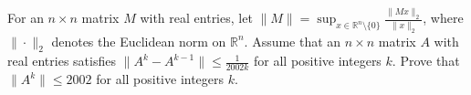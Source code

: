 For an \(n\times n\) matrix \(M\) with real entries, let \(\|M\|=\sup_{x\in \mathbb{R}^{n}\setminus\{0\}}\frac{\|Mx\|_{2}}{\|x\|_{2}}\), where \(\|\cdot\|_{2}\) denotes the Euclidean norm on \(\mathbb{R}^{n}\).
Assume that an \(n\times n\) matrix \(A\) with real entries satisfies \(\|A^{k}-A^{k-1}\|\leq\frac{1}{2002k}\) for all positive integers \(k\).
Prove that \(\|A^{k}\|\leq 2002\) for all positive integers \(k\).
